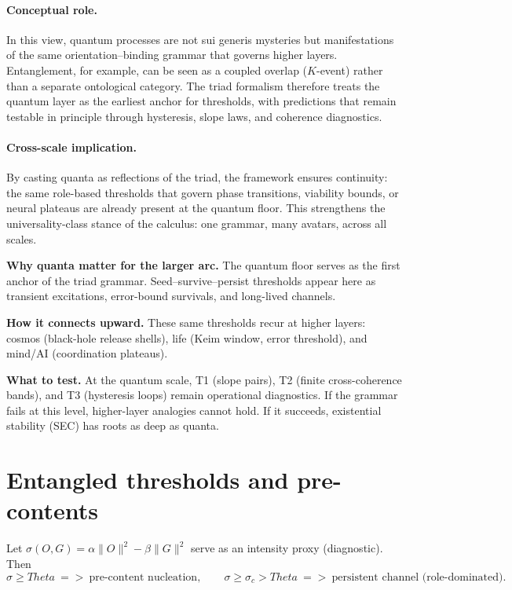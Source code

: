 \documentclass[12pt,a4paper,oneside]{scrreprt}
\def\Theta{Theta}%
\def\Rightarrow{=>}%
\begin{document}
\paragraph{Conceptual role.} 
In this view, quantum processes are not sui generis mysteries but 
manifestations of the same orientation–binding grammar that governs 
higher layers. 
Entanglement, for example, can be seen as a coupled overlap ($K$-event) 
rather than a separate ontological category. 
The triad formalism therefore treats the quantum layer as the earliest anchor 
for thresholds, with predictions that remain testable in principle through 
hysteresis, slope laws, and coherence diagnostics. 

\paragraph{Cross-scale implication.} 
By casting quanta as reflections of the triad, the framework ensures 
continuity: the same role-based thresholds that govern phase transitions, 
viability bounds, or neural plateaus are already present at the quantum floor. 
This strengthens the universality-class stance of the calculus: 
one grammar, many avatars, across all scales.

\begin{roadmap}
\textbf{Why quanta matter for the larger arc.}  
The quantum floor serves as the first anchor of the triad grammar.  
Seed–survive–persist thresholds appear here as transient excitations, 
error-bound survivals, and long-lived channels.  

\textbf{How it connects upward.}  
These same thresholds recur at higher layers:  
cosmos (black-hole release shells),  
life (Keim window, error threshold),  
and mind/AI (coordination plateaus).  

\textbf{What to test.}  
At the quantum scale, T1 (slope pairs), T2 (finite cross-coherence bands), 
and T3 (hysteresis loops) remain operational diagnostics.  
If the grammar fails at this level, higher-layer analogies cannot hold.  
If it succeeds, existential stability (SEC) has roots as deep as quanta.
\end{roadmap}

\section{Entangled thresholds and pre-contents}\label{sec:quanta-thresholds}

Let $\sigma(O,G)=\alpha \|O\|^2 - \beta \|G\|^2$ serve as an intensity proxy (diagnostic). Then
\[
\sigma \ge \Theta \ \Rightarrow \ \text{pre-content nucleation}, 
\qquad
\sigma \ge \sigma_c > \Theta \ \Rightarrow \ \text{persistent channel (role-dominated)}.
\]
\end{document}
